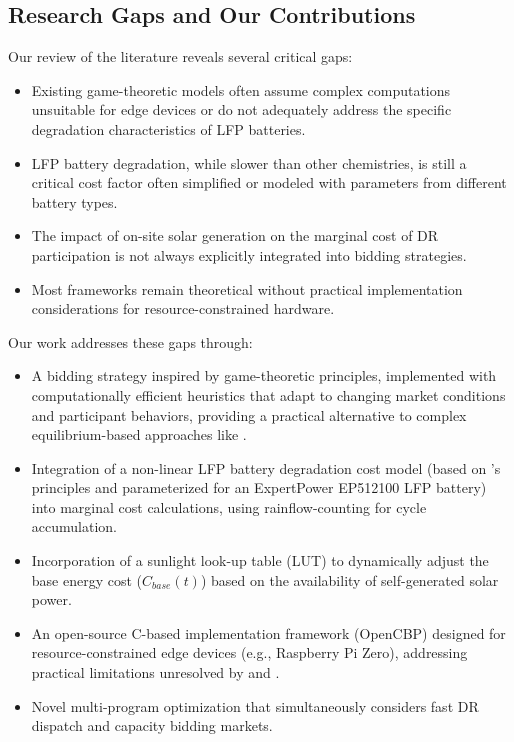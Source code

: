 \documentclass[11pt,a4paper]{article}
\begin{document}
\subsection{Research Gaps and Our Contributions}
Our review of the literature reveals several critical gaps:
\begin{itemize}
    \item Existing game-theoretic models often assume complex computations unsuitable for edge devices or do not adequately address the specific degradation characteristics of LFP batteries.
    \item LFP battery degradation, while slower than other chemistries, is still a critical cost factor often simplified or modeled with parameters from different battery types.
    \item The impact of on-site solar generation on the marginal cost of DR participation is not always explicitly integrated into bidding strategies.
    \item Most frameworks remain theoretical without practical implementation considerations for resource-constrained hardware.
\end{itemize}

Our work addresses these gaps through:
\begin{itemize}
    \item A bidding strategy inspired by game-theoretic principles, implemented with computationally efficient heuristics that adapt to changing market conditions and participant behaviors, providing a practical alternative to complex equilibrium-based approaches like \citet{Nekouei2015}.
    \item Integration of a non-linear LFP battery degradation cost model (based on \citet{Millner2010}'s principles and parameterized for an ExpertPower EP512100 LFP battery) into marginal cost calculations, using rainflow-counting for cycle accumulation.
    \item Incorporation of a sunlight look-up table (LUT) to dynamically adjust the base energy cost ($C_{base}(t)$) based on the availability of self-generated solar power.
    \item An open-source C-based implementation framework (OpenCBP) designed for resource-constrained edge devices (e.g., Raspberry Pi Zero), addressing practical limitations unresolved by \citet{Iria2019} and \citet{Lakshmanan2021}.
    \item Novel multi-program optimization that simultaneously considers fast DR dispatch and capacity bidding markets.
\end{itemize}
\end{document}
